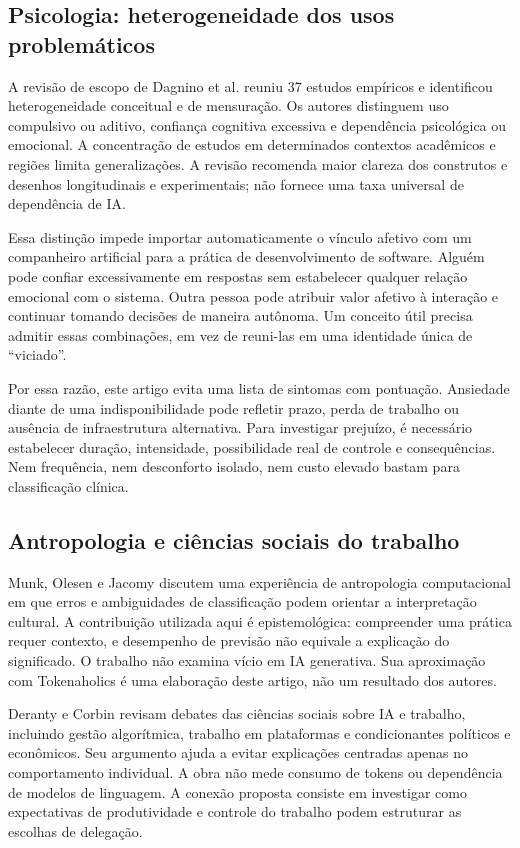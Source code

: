 \documentclass[11pt,a4paper]{article}
\begin{document}
\subsection{Psicologia: heterogeneidade dos usos problemáticos}
A revisão de escopo de Dagnino et al. \cite{dagnino} reuniu 37 estudos empíricos e identificou heterogeneidade conceitual e de mensuração. Os autores distinguem uso compulsivo ou aditivo, confiança cognitiva excessiva e dependência psicológica ou emocional. A concentração de estudos em determinados contextos acadêmicos e regiões limita generalizações. A revisão recomenda maior clareza dos construtos e desenhos longitudinais e experimentais; não fornece uma taxa universal de dependência de IA.

Essa distinção impede importar automaticamente o vínculo afetivo com um companheiro artificial para a prática de desenvolvimento de software. Alguém pode confiar excessivamente em respostas sem estabelecer qualquer relação emocional com o sistema. Outra pessoa pode atribuir valor afetivo à interação e continuar tomando decisões de maneira autônoma. Um conceito útil precisa admitir essas combinações, em vez de reuni-las em uma identidade única de ``viciado''.

Por essa razão, este artigo evita uma lista de sintomas com pontuação. Ansiedade diante de uma indisponibilidade pode refletir prazo, perda de trabalho ou ausência de infraestrutura alternativa. Para investigar prejuízo, é necessário estabelecer duração, intensidade, possibilidade real de controle e consequências. Nem frequência, nem desconforto isolado, nem custo elevado bastam para classificação clínica.

\subsection{Antropologia e ciências sociais do trabalho}
Munk, Olesen e Jacomy \cite{munk} discutem uma experiência de antropologia computacional em que erros e ambiguidades de classificação podem orientar a interpretação cultural. A contribuição utilizada aqui é epistemológica: compreender uma prática requer contexto, e desempenho de previsão não equivale a explicação do significado. O trabalho não examina vício em IA generativa. Sua aproximação com Tokenaholics é uma elaboração deste artigo, não um resultado dos autores.

Deranty e Corbin \cite{sociologia} revisam debates das ciências sociais sobre IA e trabalho, incluindo gestão algorítmica, trabalho em plataformas e condicionantes políticos e econômicos. Seu argumento ajuda a evitar explicações centradas apenas no comportamento individual. A obra não mede consumo de tokens ou dependência de modelos de linguagem. A conexão proposta consiste em investigar como expectativas de produtividade e controle do trabalho podem estruturar as escolhas de delegação.
\end{document}
